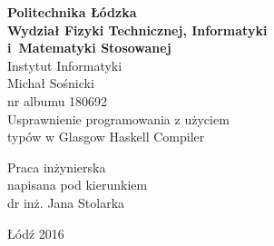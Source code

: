 \begin{titlepage}
\begin{center}
\textbf{{\large Politechnika Łódzka}\\}
\vspace{\medskipamount}
\textbf{\large Wydział Fizyki Technicznej, Informatyki\\i~Matematyki Stosowanej}
\vspace{\medskipamount}\\
{\large Instytut Informatyki}\\
\vspace{2.5cm}
{\Large Michał Sośnicki\\nr albumu 180692\\}
\vspace{2cm}
{\huge{Usprawnienie programowania z użyciem\\typów w Glasgow Haskell Compiler}}
\end{center}
\vspace{3cm}
\hfill
\begin{minipage}{.55\columnwidth}
Praca inżynierska\\
napisana pod kierunkiem\\
dr inż. Jana Stolarka
\end{minipage}
\vfill
\begin{center}
Łódź 2016
\end{center}
\end{titlepage}
